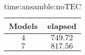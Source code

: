 \begin{table}[!ht]
	\centering
	\begin{tabular}{|c|c|}
		\hline
		Models & elapsed \\ \hline
		$4$ & $749.72$ \\ \hline
		$7$ & $817.56$ \\ \hline
	\end{tabular}
	\caption{time:ansamble:noTEC}
	\label{tab:time:ansamble:noTEC}
\end{table}
